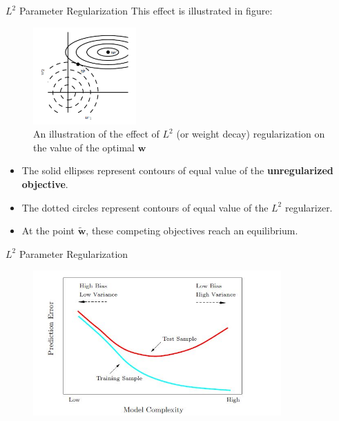 \documentclass[10pt]{beamer}
\begin{document}
	\begin{frame}{$L^2$ Parameter Regularization}
		This effect is illustrated in figure:
		\begin{figure}
			\caption{An illustration of the effect of $L^2$ (or weight decay) regularization on the value of the optimal $\bm{w}$}
			\vspace{-1em}
			\includegraphics[height=10em]{figures/l2-regularization.png}
			\vspace{-1em}
		\end{figure}
		\begin{itemize}
			\pause
			\item The solid ellipses represent contours of equal value of the \textbf{unregularized objective}.
			\pause
			\item The dotted circles represent contours of equal value of the $L^2$ regularizer.
			\pause
			\item At the point $\tilde{\bm{w}}$, these competing objectives reach an equilibrium.
		\end{itemize}
	\end{frame}
	
	\begin{frame}{$L^2$ Parameter Regularization}
		\begin{figure}
			\includegraphics[height=15em]{figures/bias-variance.jpg}
		\end{figure}
	\end{frame}
\end{document}
